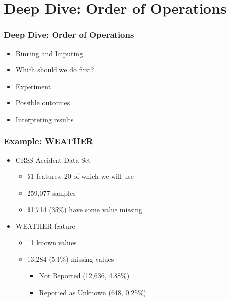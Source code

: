 \section{Deep Dive:  Order of Operations}

\begin{frame}[t]
	\frametitle{Deep Dive:  Order of Operations}
\Large

	\begin{itemize}
		\item Binning and Imputing
		\item Which should we do first?		
		\item Experiment
		\item Possible outcomes
		\item Interpreting results
	\end{itemize}
	
\end{frame}

\begin{frame}[t]
	\frametitle{Example:  WEATHER}
\Large

	\begin{itemize}
		\item CRSS Accident Data Set
		\begin{itemize}
			\Large
			\item 51 features, 20 of which we will use
			\item 259,077 samples
			\item 91,714 (35\%) have some value missing
		\end{itemize}
		\item WEATHER feature
		\begin{itemize}
			\Large
			\item 11 known values	
			
			\vskip 6pt
			\item 13,284 (5.1\%) missing values
			\begin{itemize}
				\Large
				\item Not Reported (12,636, 4.88\%)
				\item Reported as Unknown (648, 0.25\%)
			\end{itemize}
		\end{itemize}
	\end{itemize}
	
\end{frame}

